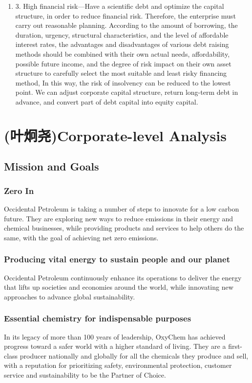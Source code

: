 \documentclass[
	a4paper, %
	12pt,%
]{CSSullivanBusinessReport}
\begin{document}
\begin{fullwidth}
\begin{enumerate}
    \item 3.	High financial risk—Have a scientific debt and optimize the capital structure, in order to reduce financial risk. Therefore, the enterprise must carry out reasonable planning. According to the amount of borrowing, the duration, urgency, structural characteristics, and the level of affordable interest rates, the advantages and disadvantages of various debt raising methods should be combined with their own actual needs, affordability, possible future income, and the degree of risk impact on their own asset structure to carefully select the most suitable and least risky financing method, In this way, the risk of insolvency can be reduced to the lowest point. We can adjust corporate capital structure, return long-term debt in advance, and convert part of debt capital into equity capital.
\end{enumerate}

\section{(叶炯尧)Corporate-level Analysis}

\subsection{Mission and Goals}
\subsubsection{Zero In}
Occidental Petroleum is taking a number of steps to innovate for a low carbon future. They are exploring new ways to reduce emissions in their energy and chemical businesses, while providing products and services to help others do the same, with the goal of achieving net zero emissions.
\subsubsection{Producing vital energy to sustain people and our planet}
Occidental Petroleum continuously enhance its operations to deliver the energy that lifts up societies and economies around the world, while innovating new approaches to advance global sustainability.
\subsubsection{Essential chemistry for indispensable purposes}
In its legacy of more than 100 years of leadership, OxyChem has achieved progress toward a safer world with a higher standard of living. They are a first-class producer nationally and globally for all the chemicals they produce and sell, with a reputation for prioritizing safety, environmental protection, customer service and sustainability to be the Partner of Choice.

\end{fullwidth}
\end{document}
